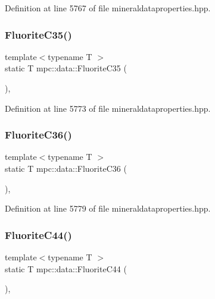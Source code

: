 Definition at line 5767 of file mineraldataproperties.\+hpp.

\mbox{\label{namespacempc_1_1data_a34dec5be9da7baa3293f5063ff28a57d}} 
\subsubsection{\texorpdfstring{Fluorite\+C35()}{FluoriteC35()}}
{\footnotesize\ttfamily template$<$typename T $>$ \\
static T mpc\+::data\+::\+Fluorite\+C35 (\begin{DoxyParamCaption}{ }\end{DoxyParamCaption})\hspace{0.3cm}{\ttfamily [inline]}, {\ttfamily [static]}}



Definition at line 5773 of file mineraldataproperties.\+hpp.

\mbox{\label{namespacempc_1_1data_a6d4e736077f3a06119f1e1c19de1831f}} 
\subsubsection{\texorpdfstring{Fluorite\+C36()}{FluoriteC36()}}
{\footnotesize\ttfamily template$<$typename T $>$ \\
static T mpc\+::data\+::\+Fluorite\+C36 (\begin{DoxyParamCaption}{ }\end{DoxyParamCaption})\hspace{0.3cm}{\ttfamily [inline]}, {\ttfamily [static]}}



Definition at line 5779 of file mineraldataproperties.\+hpp.

\mbox{\label{namespacempc_1_1data_a44562307085553166b270cddf142878b}} 
\subsubsection{\texorpdfstring{Fluorite\+C44()}{FluoriteC44()}}
{\footnotesize\ttfamily template$<$typename T $>$ \\
static T mpc\+::data\+::\+Fluorite\+C44 (\begin{DoxyParamCaption}{ }\end{DoxyParamCaption})\hspace{0.3cm}{\ttfamily [inline]}, {\ttfamily [static]}}



